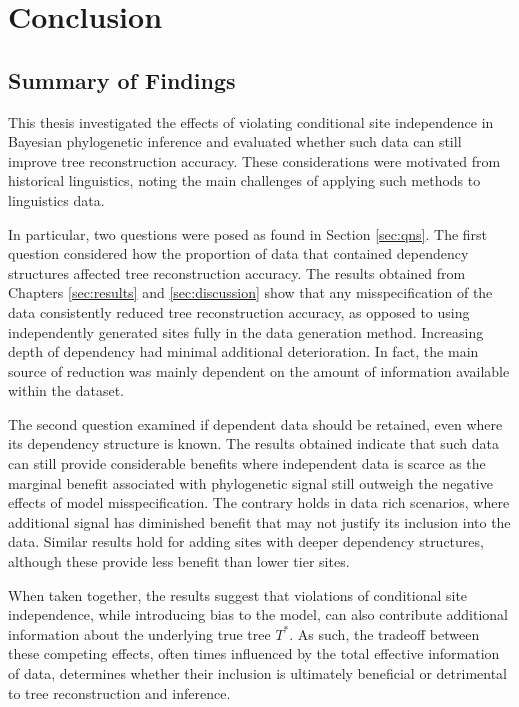 \chapter{Conclusion}
\label{sec:conclusion}

\section{Summary of Findings}
This thesis investigated the effects of violating conditional site independence in Bayesian phylogenetic inference and evaluated whether such data can still improve tree reconstruction accuracy. These considerations were motivated from historical linguistics, noting the main challenges of applying such methods to linguistics data.

In particular, two questions were posed as found in Section \ref{sec:qns}. The first question considered how the proportion of data that contained dependency structures affected tree reconstruction accuracy. The results obtained from Chapters \ref{sec:results} and \ref{sec:discussion} show that any misspecification of the data consistently reduced tree reconstruction accuracy, as opposed to using independently generated sites fully in the data generation method. Increasing depth of dependency had minimal additional deterioration. In fact, the main source of reduction was mainly dependent on the amount of information available within the dataset.

The second question examined if dependent data should be retained, even where its dependency structure is known. The results obtained indicate that such data can still provide considerable benefits where independent data is scarce as the marginal benefit associated with phylogenetic signal still outweigh the negative effects of model misspecification. The contrary holds in data rich scenarios, where additional signal has diminished benefit that may not justify its inclusion into the data. Similar results hold for adding sites with deeper dependency structures, although these provide less benefit than lower tier sites. 

When taken together, the results suggest that violations of conditional site independence, while introducing bias to the model, can also contribute additional information about the underlying true tree $T^*$. As such, the tradeoff between these competing effects, often times influenced by the total effective information of data, determines whether their inclusion is ultimately beneficial or detrimental to tree reconstruction and inference.

